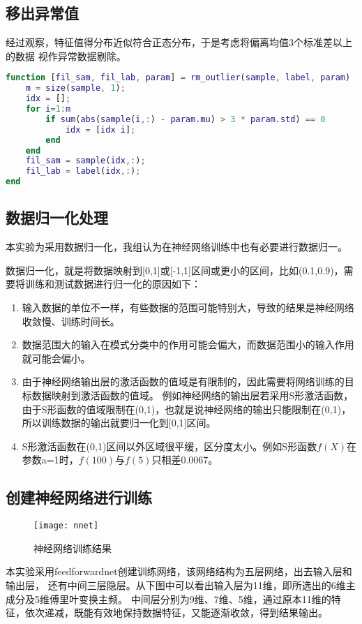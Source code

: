 \subsection{移出异常值}

经过观察，特征值得分布近似符合正态分布，于是考虑将偏离均值3个标准差以上的数据
视作异常数据剔除。

\begin{lstlisting}[language=Matlab]
function [fil_sam, fil_lab, param] = rm_outlier(sample, label, param)
	m = size(sample, 1);
	idx = [];
	for i=1:m
		if sum(abs(sample(i,:) - param.mu) > 3 * param.std) == 0
			idx = [idx i];
		end
	end
	fil_sam = sample(idx,:);
	fil_lab = label(idx,:);
end
\end{lstlisting}

\subsection{数据归一化处理}

本实验为采用数据归一化，我组认为在神经网络训练中也有必要进行数据归一。

数据归一化，就是将数据映射到[0,1]或[-1,1]区间或更小的区间，比如(0.1,0.9)，需要将训练和测试数据进行归一化的原因如下：

\begin{enumerate}
	\item 输入数据的单位不一样，有些数据的范围可能特别大，导致的结果是神经网络收敛慢、训练时间长。
	\item 数据范围大的输入在模式分类中的作用可能会偏大，而数据范围小的输入作用就可能会偏小。
	\item 由于神经网络输出层的激活函数的值域是有限制的，因此需要将网络训练的目标数据映射到激活函数的值域。
	例如神经网络的输出层若采用S形激活函数，由于S形函数的值域限制在(0,1)，也就是说神经网络的输出只能限制在(0,1)，
	所以训练数据的输出就要归一化到[0,1]区间。
	\item S形激活函数在(0,1)区间以外区域很平缓，区分度太小。例如S形函数$f(X)$在参数a=1时，$f(100)$与$f(5)$只相差0.0067。
\end{enumerate}

\subsection{创建神经网络进行训练}

\begin{figure}[ht]
	\centering
	\texttt{[image: nnet]}
	\caption{神经网络训练结果}
	\label{fig:nnet}
\end{figure}

本实验采用feedforwardnet创建训练网络，该网络结构为五层网络，出去输入层和输出层，
还有中间三层隐层。从下图中可以看出输入层为11维，即所选出的6维主成分及5维傅里叶变换主频。
中间层分别为9维、7维、5维，通过原本11维的特征，依次递减，既能有效地保持数据特征，又能逐渐收敛，得到结果输出。